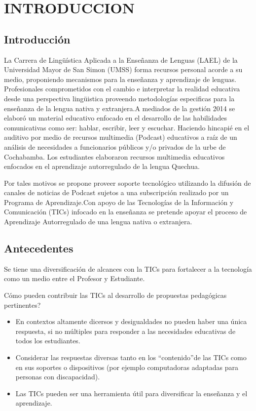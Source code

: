 \chapter{INTRODUCCION}

\section{Introducci\'{o}n}

La Carrera de Ling\"{u}ística Aplicada a la Ense\~{n}anza de Lenguas (LAEL) de la Universidad Mayor de San Simon (UMSS)
forma recursos  personal acorde a su medio, proponiendo mecanismos para la ense\~{n}anza y aprendizaje de lenguas.
Profesionales comprometidos con el cambio e interpretar la realidad educativa desde una perspectiva ling\"{u}istica 
proveendo metodolog\'{i}as especificas para la ense\~{n}anza de la lengua nativa y extranjera.A mediados de la 
gesti\'{o}n 2014 se elabor\'{o} un material educativo enfocado en el desarrollo de las habilidades comunicativas como
ser: hablar, escribir, leer y escuchar. Haciendo hincapi\'{e} en el auditivo por medio de recursos multimedia (Podcast) 
educativos a ra\'{i}z de un an\'{a}lisis de necesidades a funcionarios p\'{u}blicos y/o privados de la urbe de Cochabamba.
Los estudiantes elaboraron recursos multimedia educativos enfocados en el aprendizaje autorregulado de la lengua Quechua.

Por tales motivos se propone proveer soporte tecnol\'{o}gico utilizando la difusi\'{o}n de canales de noticias de Podcast 
sujetos a una subscripci\'{o}n realizado por un Programa de Aprendizaje.Con apoyo de las Tecnolog\'{i}as de la Informaci\'{o}n
y Comunicaci\'{o}n (TICs) infocado en la ense\~{n}anza se pretende apoyar el proceso de Aprendizaje Autorregulado de una lengua
nativa o extranjera.

\section{Antecedentes}

Se tiene una diversificaci\'{o}n de alcances con la TICs para fortalecer a la tecnolog\'{i}a como un medio entre
el Profesor y Estudiante.

\textquestiondown C\'{o}mo pueden contribuir las TICs al desarrollo de propuestas pedag\'{o}gicas pertinentes?
\begin{itemize}
\item En contextos altamente dicersos y desigualdades no pueden haber una \'{u}nica respuesta,
si no m\'{u}ltiples para responder a las necesidades educativas de todos los estudiantes.
\item Considerar las respuestas diversas tanto en los \textquotedblleft contenido\textquotedblright  de las TICs como en sus soportes o dispositivos (por ejemplo computadoras adaptadas para personas con discapacidad).
\item Las TICs pueden ser una herramienta \'{u}til para diversificar la ense\~nanza y el aprendizaje.\cite{severin2013enfoques}
\end{itemize}

